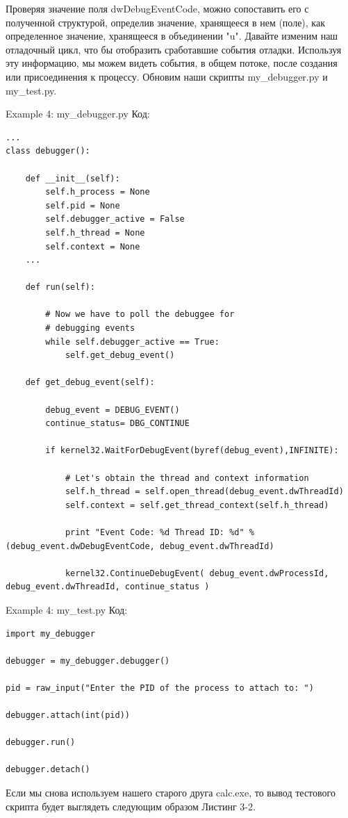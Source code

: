 \documentclass[12pt]{book}
\begin{document}
Проверяя значение поля dwDebugEventCode, можно сопоставить его с полученной структурой, определив значение, хранящееся в нем (поле), как определенное значение, хранящееся в объединении "u". Давайте изменим наш отладочный цикл, что бы отобразить сработавшие события отладки. Используя эту информацию, мы можем видеть события, в общем потоке, после создания или присоединения к процессу. Обновим наши скрипты my\_debugger.py и my\_test.py.

Example 4: my\_debugger.py
Код:
\begin{lstlisting}
...
class debugger():

    def __init__(self):
        self.h_process = None
        self.pid = None
        self.debugger_active = False
        self.h_thread = None
        self.context = None
    ...

    def run(self):
        
        # Now we have to poll the debuggee for 
        # debugging events           
        while self.debugger_active == True:
            self.get_debug_event()

    def get_debug_event(self):

        debug_event = DEBUG_EVENT()
        continue_status= DBG_CONTINUE

        if kernel32.WaitForDebugEvent(byref(debug_event),INFINITE):

            # Let's obtain the thread and context information
            self.h_thread = self.open_thread(debug_event.dwThreadId)
            self.context = self.get_thread_context(self.h_thread)

            print "Event Code: %d Thread ID: %d" % (debug_event.dwDebugEventCode, debug_event.dwThreadId)

            kernel32.ContinueDebugEvent( debug_event.dwProcessId, debug_event.dwThreadId, continue_status )
\end{lstlisting}

Example 4: my\_test.py
Код:
\begin{lstlisting}
import my_debugger

debugger = my_debugger.debugger()

pid = raw_input("Enter the PID of the process to attach to: ")

debugger.attach(int(pid))

debugger.run()

debugger.detach()
\end{lstlisting}

Если мы снова используем нашего старого друга calc.exe, то вывод тестового скрипта будет выглядеть следующим образом Листинг 3-2.
\end{document}
